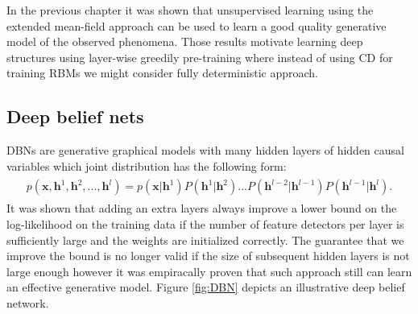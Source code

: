 In the previous chapter it was shown that unsupervised learning using the extended mean-field approach can be used to learn a good quality generative model of the observed phenomena. Those results motivate learning deep structures using layer-wise greedily pre-training where instead of using CD for training RBMs we might consider fully deterministic approach. 
\subsection{Deep belief nets}
DBNs are generative graphical models with many hidden layers of hidden
causal variables which joint distribution has the following form:
\begin{align}
\begin{split}
p(\mathbf{x}, \mathbf{h}^1, \mathbf{h}^2,..., \mathbf{h}^l) = p(\mathbf{x}| \mathbf{h}^1)P(\mathbf{h}^1|\mathbf{h}^2)...
P(\mathbf{h}^{l-2}|\mathbf{h}^{l-1})P(\mathbf{h}^{l-1}|\mathbf{h}^{l}).
\end{split}
\end{align}
It was shown that adding an extra layers always improve a lower bound on the log-likelihood on the training data if the number of feature detectors per layer is sufficiently large and the weights are initialized correctly.  The guarantee that we improve the bound is no longer valid if the size of subsequent hidden layers is not large enough however it was empiracally proven that such approach still can learn an effective generative model. Figure \ref{fig:DBN} depicts an illustrative deep belief network. 

